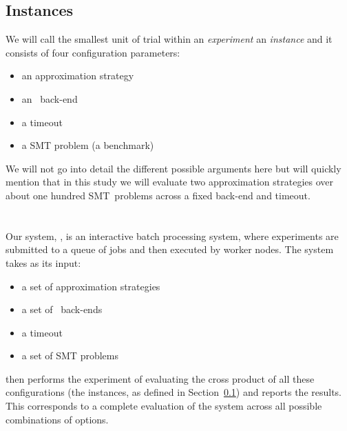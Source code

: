 \documentclass[a4paper]{IEEEtran}
\begin{document}
\begin{Figure}
\centering
{}
  \label{fig:uppsat}
\end{Figure}

\subsection{Instances}\label{sec:instances}
We will call the smallest unit of trial within an \emph{experiment} an
\emph{instance} and it consists of four configuration parameters:
\begin{itemize}
\item an approximation strategy
\item an \uppsat{}\ back-end
\item a timeout
\item a SMT problem (a benchmark)
\end{itemize}

We will not go into detail the different possible arguments here but will
quickly mention that in this study we will evaluate two approximation strategies
over about one hundred SMT~problems across a fixed back-end and timeout.

\section{\testbench{}}

Our system, \testbench{}, is an interactive batch processing system,
where experiments are submitted to a queue of jobs and then executed
by worker nodes. The system takes as its input:
\begin{itemize}
  \item a set of approximation strategies
  \item a set of \uppsat{}\ back-ends
  \item a timeout
  \item a set of SMT problems
\end{itemize}
\testbench{} then performs the experiment of evaluating the cross product of all
these configurations (the instances, as defined in Section~\ref{sec:instances})
and reports the results. This corresponds to a complete evaluation of the system
across all possible combinations of options.
\end{document}
